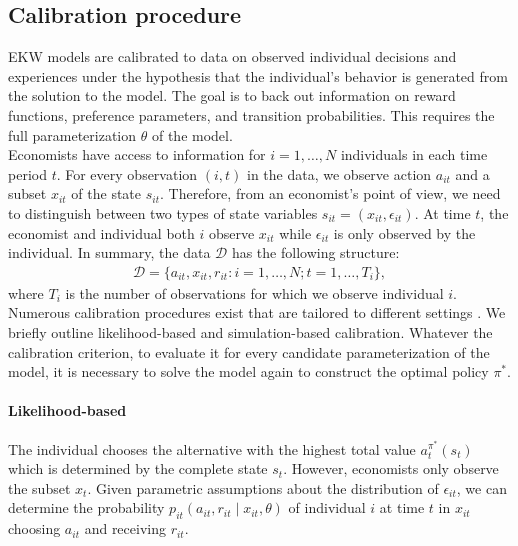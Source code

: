 \subsection{Calibration procedure}
EKW models are calibrated to data on observed individual decisions and experiences under the hypothesis that the individual's behavior is generated from the solution to the model. The goal is to back out information on reward functions, preference parameters, and transition probabilities. This requires the full parameterization $\theta$ of the model.\\

\noindent Economists have access to information for $i = 1, \hdots, N$ individuals in each time period $t$. For every observation $(i, t)$ in the data, we observe action $a_{it}$ and a subset $x_{it}$ of the state $s_{it}$. Therefore, from an economist's point of view, we need to distinguish between two types of state variables $s_{it} = (x_{it}, \epsilon_{it})$. At time $t$, the economist and individual both $i$ observe $x_{it}$ while $\epsilon_{it}$ is only observed by the individual. In summary, the data $\mathcal{D}$ has the following structure:
%
\begin{align*}
  \mathcal{D} = \{a_{it}, x_{it}, r_{it}: i = 1, \hdots, N; t = 1, \hdots, T_i\},
\end{align*}
where $T_i$ is the number of observations for which we observe individual $i$.\\

\noindent Numerous calibration procedures exist that are tailored to different settings \citep{Davidson.2003, Gourieroux.1996}. We briefly outline likelihood-based and simulation-based calibration. Whatever the calibration criterion, to evaluate it for every candidate parameterization of the model, it is necessary to solve the model again to construct the optimal policy $\pi^*$.

\paragraph{Likelihood-based} The individual chooses the alternative with the highest total value $a_t^{\pi^*}(s_t)$ which is determined by the complete state $s_t$. However, economists only observe the subset $x_t$. Given parametric assumptions about the distribution of $\epsilon_{it}$, we can determine the probability $p_{it}(a_{it}, r_{it} \mid x_{it}, \theta)$ of individual $i$ at time $t$ in $x_{it}$ choosing $a_{it}$ and receiving $r_{it}$.\\

